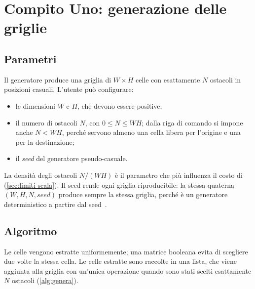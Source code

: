 \section{Compito Uno: generazione delle griglie}
\label{sec:compito1}

\subsection{Parametri}

Il generatore  produce una
griglia di $W \times H$ celle con esattamente $N$ ostacoli in posizioni
casuali. L'utente può configurare:

\begin{itemize}
  \item le dimensioni $W$ e $H$, che devono essere positive;
  \item il numero di ostacoli $N$, con $0 \le N \le W H$; dalla riga di
        comando si impone anche $N < W H$, perché servono almeno una cella
        libera per l'origine e una per la destinazione;
  \item il \emph{seed} del generatore pseudo-casuale.
\end{itemize}

La densità degli ostacoli $N/(WH)$ è il parametro che più influenza il costo
di \cmin{} (\cref{sec:limiti-scala}). Il seed rende ogni griglia
riproducibile: la stessa quaterna $(W,H,N,\mathit{seed})$ produce sempre la
stessa griglia, perché  è un generatore deterministico
a partire dal seed~\cite{random}.

\subsection{Algoritmo}

Le celle vengono estratte uniformemente; una matrice booleana evita di
scegliere due volte la stessa cella. Le celle estratte sono raccolte in una
lista, che viene aggiunta alla griglia con un'unica operazione quando sono
stati scelti esattamente $N$ ostacoli (\cref{alg:genera}).

